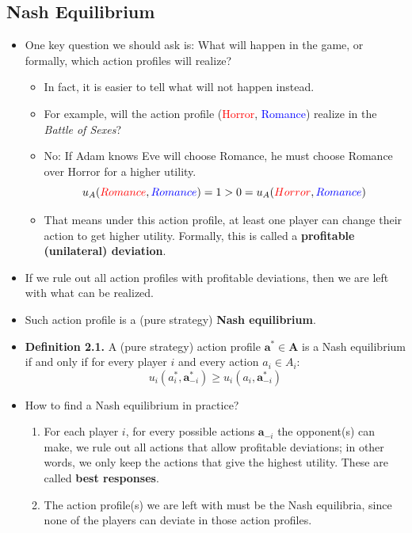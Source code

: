 \documentclass[notitlepage]{article}
\begin{document}
\subsection{Nash Equilibrium}

\begin{itemize}
    \item One key question we should ask is: What will happen in the game, or formally, which action profiles will realize?
    \begin{itemize}
        \item In fact, it is easier to tell what will not happen instead.
        \item For example, will the action profile (\textcolor{red}{Horror}, \textcolor{blue}{Romance}) realize in the \textit{Battle of Sexes}?
        \item No: If Adam knows Eve will choose Romance, he must choose Romance over Horror for a higher utility.
        \[
        u_A(\textcolor{red}{Romance}, \textcolor{blue}{Romance}) = 1 > 0 = u_A(\textcolor{red}{Horror}, \textcolor{blue}{Romance})
        \]
        \item That means under this action profile, at least one player can change their action to get higher utility. Formally, this is called a \textbf{profitable (unilateral) deviation}.
    \end{itemize}
    \item If we rule out all action profiles with profitable deviations, then we are left with what can be realized.
    \item Such action profile is a (pure strategy) \textbf{Nash equilibrium}.
    \item \textbf{Definition 2.1.} A (pure strategy) action profile \(\mathbf{a^*} \in \mathbf{A}\) is a Nash equilibrium if and only if for every player \(i\) and every action \(a_i \in A_i\):
    \[
    u_i(a^*_i,\mathbf{a}^*_{-i}) \ge u_i(a_i,\mathbf{a}^*_{-i})
    \]
    \item How to find a Nash equilibrium in practice?
    \begin{enumerate}
        \item For each player \(i\), for every possible actions \(\mathbf{a}_{-i}\) the opponent(s) can make, we rule out all actions that allow profitable deviations; in other words, we only keep the actions that give the highest utility. These are called \textbf{best responses}.
        \item The action profile(s) we are left with must be the Nash equilibria, since none of the players can deviate in those action profiles.

\end{enumerate}
\end{itemize}
\end{document}
